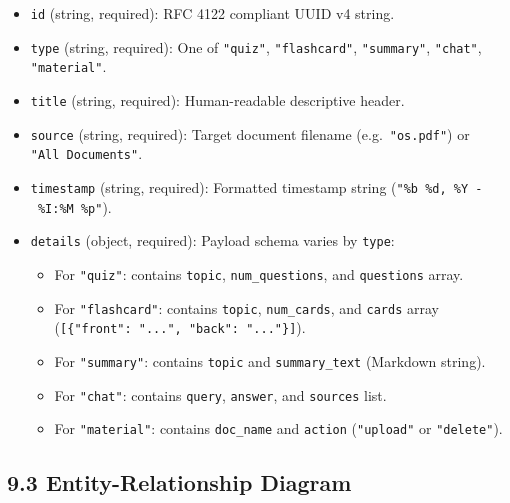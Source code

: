 \documentclass[
]{article}
\providecommand{\tightlist}{%
  \setlength{\itemsep}{0pt}\setlength{\parskip}{0pt}}
\begin{document}
\begin{itemize}
\tightlist
\item
  \texttt{id} (string, required): RFC 4122 compliant UUID v4 string.
\item
  \texttt{type} (string, required): One of \texttt{"quiz"},
  \texttt{"flashcard"}, \texttt{"summary"}, \texttt{"chat"},
  \texttt{"material"}.
\item
  \texttt{title} (string, required): Human-readable descriptive header.
\item
  \texttt{source} (string, required): Target document filename
  (e.g.~\texttt{"os.\allowbreak pdf"}) or \texttt{"All\ \allowbreak Documents"}.
\item
  \texttt{timestamp} (string, required): Formatted timestamp string
  (\texttt{"\%b\ \allowbreak \%d,\allowbreak \ \allowbreak \%Y\ \allowbreak -\ \allowbreak \%I:\%M\ \allowbreak \%p"}).
\item
  \texttt{details} (object, required): Payload schema varies by
  \texttt{type}:

  \begin{itemize}
  \tightlist
  \item
    For \texttt{"quiz"}: contains \texttt{topic},
    \texttt{num\_\allowbreak questions}, and \texttt{questions} array.
  \item
    For \texttt{"flashcard"}: contains \texttt{topic},
    \texttt{num\_\allowbreak cards}, and \texttt{cards} array
    (\texttt{{[}\{"front":\ \allowbreak ".\allowbreak .\allowbreak .",\allowbreak \ \allowbreak "back":\ \allowbreak ".\allowbreak .\allowbreak ."\}{]}}).
  \item
    For \texttt{"summary"}: contains \texttt{topic} and
    \texttt{summary\_\allowbreak text} (Markdown string).
  \item
    For \texttt{"chat"}: contains \texttt{query}, \texttt{answer}, and
    \texttt{sources} list.
  \item
    For \texttt{"material"}: contains \texttt{doc\_\allowbreak name} and
    \texttt{action} (\texttt{"upload"} or \texttt{"delete"}).
  \end{itemize}
\end{itemize}

\subsection{9.3 Entity-Relationship
Diagram}\label{entity-relationship-diagram}
\end{document}
